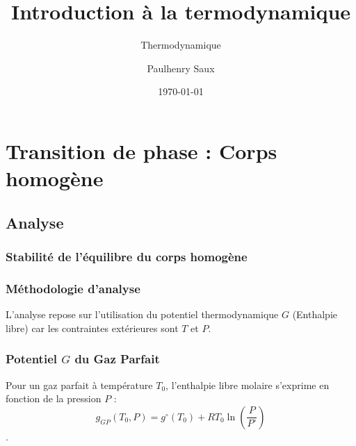 \documentclass[french]{yLectureNote}
\title{Introduction à la termodynamique}
\subtitle{Thermodynamique}
\author{Paulhenry Saux}
\date{\today}
\begin{document}
\setcounter{chapter}{5}

\chapter{Transition de phase : Corps homogène}

\section{Analyse}
\subsection{Stabilité de l'équilibre du corps homogène}




\subsection{Méthodologie d'analyse}


\begin{proposition}
L'analyse repose sur l'utilisation du potentiel thermodynamique $G$ (Enthalpie libre) car les contraintes extérieures sont $T$ et $P$.
\end{proposition}




\subsection{Potentiel $G$ du Gaz Parfait}

\begin{definition}
Pour un gaz parfait à température $T_0$, l'enthalpie libre molaire s'exprime en fonction de la pression $P$ :
$$g_{GP}(T_0, P) = g^\circ(T_0) + RT_0 \ln\left(\frac{P}{P^\circ}\right)$$.
\end{definition}
\end{document}
